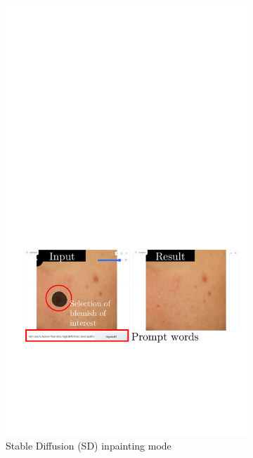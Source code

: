 \begin{spacing}{1.5}
\begin{figure}[t!]
    \centering
    \begin{subfigure}{.97\textwidth}
        \centering
        \includegraphics[width=0.97\columnwidth]{Chapter4/sd_ui.pdf}
        \caption{Stable Diffusion (SD) inpainting mode}
        \label{fig:sd}
    \end{subfigure}\hfill
    \begin{subfigure}{.97\textwidth}
        \centering

\end{subfigure}
\end{figure}
\end{spacing}
